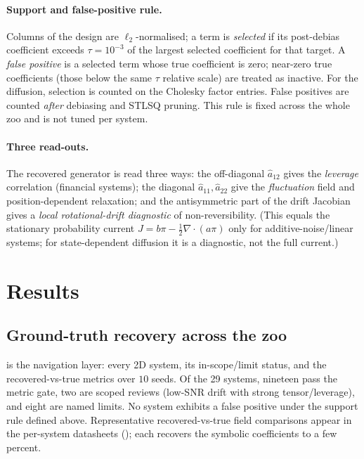 \documentclass[11pt]{article}
\newcommand{\drift}{b}
\newcommand{\diff}{a}
\begin{document}
\paragraph{Support and false-positive rule.}
Columns of the design are $\ell_2$-normalised; a term is \emph{selected} if its post-debias
coefficient exceeds $\tau=10^{-3}$ of the largest selected coefficient for that target. A
\emph{false positive} is a selected term whose true coefficient is zero; near-zero true
coefficients (those below the same $\tau$ relative scale) are treated as inactive. For the
diffusion, selection is counted on the Cholesky factor entries. False positives are counted
\emph{after} debiasing and STLSQ pruning. This rule is fixed across the whole zoo and is not
tuned per system.

\paragraph{Three read-outs.}
The recovered generator is read three ways: the off-diagonal $\hat\diff_{12}$ gives the
\emph{leverage} correlation (financial systems); the diagonal $\hat\diff_{11},\hat\diff_{22}$
give the \emph{fluctuation} field and position-dependent relaxation; and the antisymmetric part
of the drift Jacobian gives a \emph{local rotational-drift diagnostic} of non-reversibility.
(This equals the stationary probability current
$J=\drift\pi-\tfrac{1}{2}\nabla\!\cdot(\diff\pi)$ only for additive-noise/linear systems; for
state-dependent diffusion it is a diagnostic, not the full current.)

\section{Results}\label{sec:results}

\subsection{Ground-truth recovery across the zoo}\label{sec:showcase}

 is the navigation layer: every 2D system, its in-scope/limit status, and the
recovered-vs-true metrics over $10$ seeds. Of the 29 systems, nineteen pass the metric gate, two
are scoped reviews (low-SNR drift with strong tensor/leverage), and eight are named limits. No
system exhibits a false positive under the support rule defined above. Representative
recovered-vs-true field comparisons appear in the per-system datasheets ();
each recovers the symbolic coefficients to a few percent.
\end{document}
